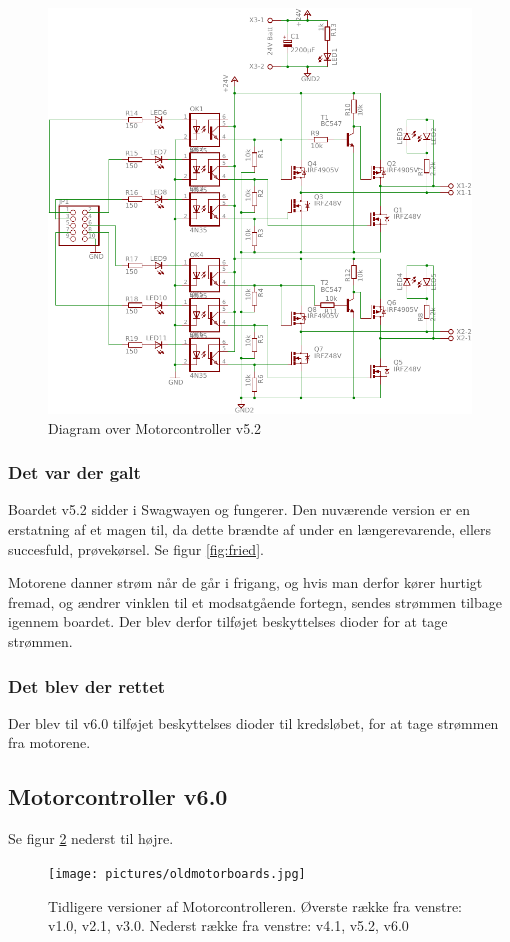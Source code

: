 \documentclass[a4paper,11pt,oneside,article,danish,table]{memoir}
\newcommand{\boarddate}[1]{\marginpar{\tiny\textcolor{blue!80!black}{#1}}}
\begin{document}
\begin{figure}[htbp]
  \centering
  \includegraphics[width=\textwidth]{pictures/MotorcontrollerSch5-2.pdf}
  \caption{Diagram over Motorcontroller v5.2}
  \label{fig:mosch5.2}
\end{figure}
\subsubsection{Det var der galt} 
Boardet v5.2 sidder i Swagwayen og fungerer. Den nuværende version er en erstatning af et magen til, da dette brændte af under en længerevarende, ellers succesfuld, prøvekørsel. Se figur \ref{fig:fried}. 

Motorene danner strøm når de går i frigang, og hvis man derfor kører hurtigt fremad, og ændrer vinklen til et modsatgående fortegn, sendes strømmen tilbage igennem boardet. Der blev derfor tilføjet beskyttelses dioder for at tage strømmen.
\subsubsection{Det blev der rettet}
Der blev til v6.0 tilføjet beskyttelses dioder til kredsløbet, for at tage strømmen fra motorene.
\subsection{Motorcontroller v6.0}
\boarddate{24. april 2012}
Se figur \ref{fig:oldmotor} nederst til højre.
\begin{figure}[htbp]
  \centering
  \texttt{[image: pictures/oldmotorboards.jpg]}
  \caption[Tidligere versioner af Motorcontrolleren]{Tidligere versioner af Motorcontrolleren. Øverste række fra venstre: v1.0, v2.1, v3.0. Nederst række fra venstre: v4.1, v5.2, v6.0}
  \label{fig:oldmotor}
\end{figure}
\end{document}
